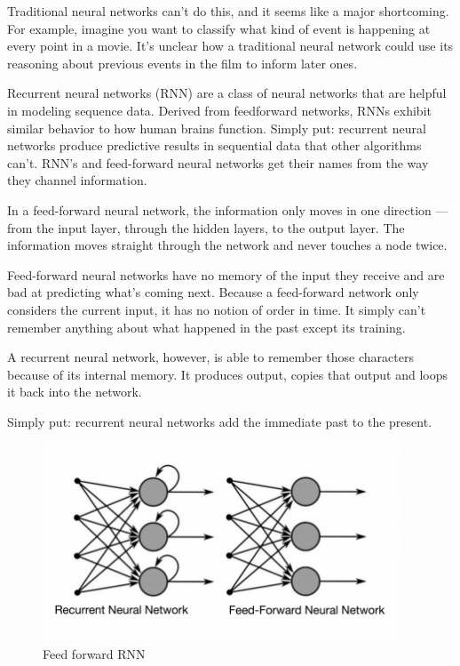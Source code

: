 \documentclass[12pt]{report}
\begin{document}
Traditional neural networks can’t do this, and it seems like a major shortcoming. For example, imagine you want to classify what kind of event is happening at every point in a movie. It’s unclear how a traditional neural network could use its reasoning about previous events in the film to inform later ones. \cite{16}

Recurrent neural networks (RNN) are a class of neural networks that are helpful in modeling sequence data. Derived from feedforward networks, RNNs exhibit similar behavior to how human brains function. Simply put: recurrent neural networks produce predictive results in sequential data that other algorithms can’t.
RNN’s and feed-forward neural networks get their names from the way they channel information.

In a feed-forward neural network, the information only moves in one direction — from the input layer, through the hidden layers, to the output layer. The information moves straight through the network and never touches a node twice.

Feed-forward neural networks have no memory of the input they receive and are bad at predicting what’s coming next. Because a feed-forward network only considers the current input, it has no notion of order in time. It simply can’t remember anything about what happened in the past except its training.

A recurrent neural network, however, is able to remember those characters because of its internal memory. It produces output, copies that output and loops it back into the network.

Simply put: recurrent neural networks add the immediate past to the present.

\begin{figure}[H]%
  \begin {center}
  \includegraphics[width=0.95\textwidth]{images/Rnn.png}
  \caption{Feed forward RNN}
  \label{fig:ecg}
  \end {center}
\end{figure}
\end{document}

